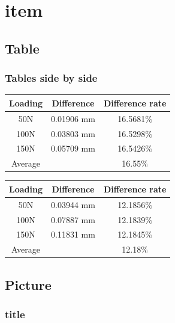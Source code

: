 \section{item}
\label{item}
\subsection{Table}
\subsubsection{Tables side by side}
\begin{minipage}[c]{0.5\textwidth}
	\label{T 4.1}
	\centering
	\begin{tabular}{@{}ccc@{}}
		\toprule
		Loading & Difference & Difference rate \\ \midrule
		50N     & 0.01906 mm & 16.5681$\%$     \\
		100N    & 0.03803 mm & 16.5298$\%$     \\
		150N    & 0.05709 mm & 16.5426$\%$     \\ \midrule
		Average &            & 16.55$\%$           \\ \bottomrule
	\end{tabular}
\end{minipage}
\begin{minipage}[c]{0.5\textwidth}
	\label{T 4.2}
	\centering
	\begin{tabular}{@{}ccc@{}}
		\toprule
		Loading & Difference & Difference rate \\ \midrule
		50N     & 0.03944 mm & 12.1856$\%$     \\
		100N    & 0.07887 mm & 12.1839$\%$     \\
		150N    & 0.11831 mm & 12.1845$\%$     \\ \midrule
		Average &            & 12.18$\%$           \\ \bottomrule
	\end{tabular}
\end{minipage}

\subsection{Picture}
\subsubsection{title}







